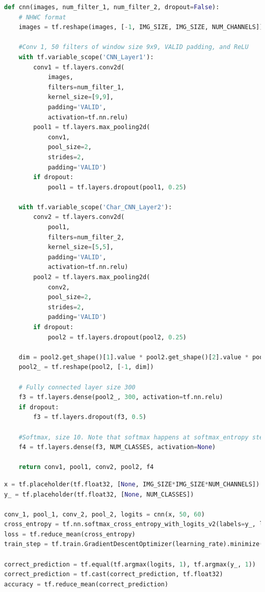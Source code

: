 \begin{lstlisting}[language=Python, caption= Definition of the cnn network, label=ls:1_l3]
def cnn(images, num_filter_1, num_filter_2, dropout=False):
    # NHWC format
    images = tf.reshape(images, [-1, IMG_SIZE, IMG_SIZE, NUM_CHANNELS])
    
    #Conv 1, 50 filters of window size 9x9, VALID padding, and ReLU
    with tf.variable_scope('CNN_Layer1'):
        conv1 = tf.layers.conv2d(
            images,
            filters=num_filter_1,
            kernel_size=[9,9],
            padding='VALID',
            activation=tf.nn.relu)
        pool1 = tf.layers.max_pooling2d(
            conv1,
            pool_size=2,
            strides=2,
            padding='VALID')
        if dropout:
            pool1 = tf.layers.dropout(pool1, 0.25)

    with tf.variable_scope('Char_CNN_Layer2'):
        conv2 = tf.layers.conv2d(
            pool1,
            filters=num_filter_2,
            kernel_size=[5,5],
            padding='VALID',
            activation=tf.nn.relu)
        pool2 = tf.layers.max_pooling2d(
            conv2,
            pool_size=2,
            strides=2,
            padding='VALID')
        if dropout:
            pool2 = tf.layers.dropout(pool2, 0.25)

    dim = pool2.get_shape()[1].value * pool2.get_shape()[2].value * pool2.get_shape()[3].value 
    pool2_ = tf.reshape(pool2, [-1, dim])
    
    # Fully connected layer size 300
    f3 = tf.layers.dense(pool2_, 300, activation=tf.nn.relu)
    if dropout:
        f3 = tf.layers.dropout(f3, 0.5)

    #Softmax, size 10. Note that softmax happens at softmax_entropy step
    f4 = tf.layers.dense(f3, NUM_CLASSES, activation=None)

    return conv1, pool1, conv2, pool2, f4
\end{lstlisting}

\begin{lstlisting}[language=Python, caption= Loss minimisation and accuracy prediction, label=ls:1_loss]
x = tf.placeholder(tf.float32, [None, IMG_SIZE*IMG_SIZE*NUM_CHANNELS])
y_ = tf.placeholder(tf.float32, [None, NUM_CLASSES])

conv_1, pool_1, conv_2, pool_2, logits = cnn(x, 50, 60)
cross_entropy = tf.nn.softmax_cross_entropy_with_logits_v2(labels=y_, logits=logits)
loss = tf.reduce_mean(cross_entropy)
train_step = tf.train.GradientDescentOptimizer(learning_rate).minimize(loss)

correct_prediction = tf.equal(tf.argmax(logits, 1), tf.argmax(y_, 1))
correct_prediction = tf.cast(correct_prediction, tf.float32)
accuracy = tf.reduce_mean(correct_prediction)
\end{lstlisting}

